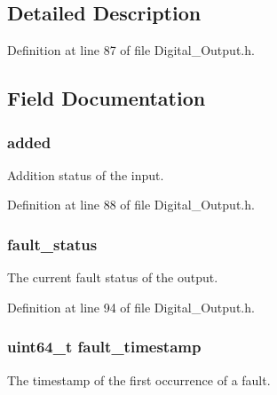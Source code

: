 \subsection{Detailed Description}


Definition at line 87 of file Digital\-\_\-\-Output.\-h.



\subsection{Field Documentation}
\hypertarget{struct_digital___output__t_a6f1a4402ff8651dfc5e453b5e3154c2d}{
\subsubsection[{added}]{ added}}\label{struct_digital___output__t_a6f1a4402ff8651dfc5e453b5e3154c2d}
Addition status of the input. 

Definition at line 88 of file Digital\-\_\-\-Output.\-h.

\hypertarget{struct_digital___output__t_a13ee06338665fcdab36b11e8c7b7df0e}{
\subsubsection[{fault\-\_\-status}]{ fault\-\_\-status}}\label{struct_digital___output__t_a13ee06338665fcdab36b11e8c7b7df0e}
The current fault status of the output. 

Definition at line 94 of file Digital\-\_\-\-Output.\-h.

\hypertarget{struct_digital___output__t_ada3dca6ca3d8c61b00b0a2a65055c21e}{
\subsubsection[{fault\-\_\-timestamp}]{\setlength{\rightskip}{0pt plus 5cm}uint64\-\_\-t fault\-\_\-timestamp}}\label{struct_digital___output__t_ada3dca6ca3d8c61b00b0a2a65055c21e}
The timestamp of the first occurrence of a fault. 

